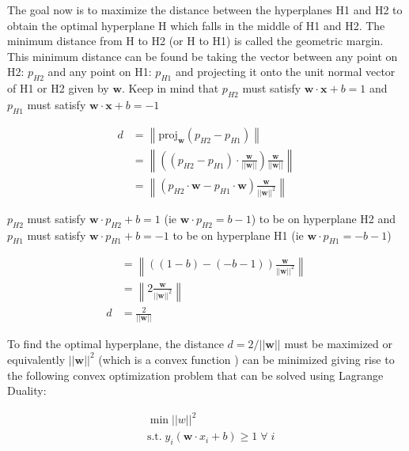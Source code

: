 The goal now is to maximize the distance between the hyperplanes H1 and H2 to obtain the optimal hyperplane H which falls in the middle of H1 and H2. The minimum distance from H to H2 (or H to H1) is called the geometric margin. This minimum distance can be found be taking the vector between any point on H2: $p_{H2}$ and any point on H1: $p_{H1}$ and projecting it onto the unit normal vector of H1 or H2 given by $\mathbf{w}$. Keep in mind that $p_{H2}$ must satisfy $\mathbf{w} \cdot \mathbf{x} + b = 1$ and $p_{H1}$ must satisfy $\mathbf{w} \cdot \mathbf{x} + b = -1$

\begin{equation*}
    \begin{split}
    d &= \left\lVert\text{proj}_\mathbf{w}{(p_{H2} - p_{H1})} \right\rVert \\
     &= \left\lVert \left ((p_{H2} - p_{H1}) \cdot \mathbf{\frac{w}{||w||}}\right ) \frac{\mathbf{w}}{||\mathbf{w}||} \right\rVert \\ 
     &= \left\lVert \left (p_{H2} \cdot \mathbf{w} - p_{H1} \cdot \mathbf{w} \right ) \frac{\mathbf{w}}{||\mathbf{w}||^2} \right\rVert
    \end{split}
\end{equation*}

 $p_{H2}$ must satisfy $\mathbf{w} \cdot p_{H2} + b = 1$ (ie $\mathbf{w} \cdot p_{H2} = b - 1$) to be on hyperplane H2 and $p_{H1}$ must satisfy $\mathbf{w} \cdot p_{H1} + b = -1$ to be on hyperplane H1 (ie $\mathbf{w} \cdot p_{H1} = -b - 1$)

\begin{equation}
    \begin{split}
     &= \left\lVert \left ((1 - b) - (-b - 1) \right ) \frac{\mathbf{w}}{||\mathbf{w}||^2} \right\rVert \\
     &= \left\lVert 2 \frac{\mathbf{w}}{||\mathbf{w}||^2} \right\rVert \\ 
     d &= \frac{2}{||\mathbf{w}||}
    \end{split}
\end{equation}

To find the optimal hyperplane, the distance $d = 2 / ||\mathbf{w}||$ must be maximized or equivalently $||\mathbf{w}||^2$ (which is a convex function \cite{cervantesComprehensiveSurveySupport2020}) can be minimized giving rise to the following convex optimization problem that can be solved using Lagrange Duality:

\begin{equation}
    \begin{split}
    & \min ||w||^2 \\
    & \text{s.t.} \; y_i (\mathbf{w} \cdot x_i + b) \geq 1 \; \forall \; i
    \end{split}
\end{equation}

